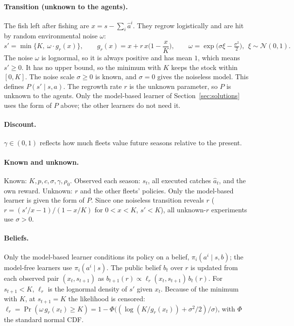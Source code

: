 \documentclass{article}
\begin{document}
\paragraph{Transition (unknown to the agents).} The fish left after fishing are $x=s-\sum_i \hat a^i$. They regrow logistically and are hit by random environmental noise $\omega$:
\begin{equation}
s'=\min\Big\{K,\ \omega\cdot g_r(x)\Big\},\qquad g_r(x)=x+r\,x\Big(1-\frac{x}{K}\Big),\qquad \omega=\exp\big(\sigma\xi-\tfrac{\sigma^2}{2}\big),\ \ \xi\sim\mathcal N(0,1).
\end{equation}
The noise $\omega$ is lognormal, so it is always positive and has mean $1$, which means $s'\ge0$. It has no upper bound, so the minimum with $K$ keeps the stock within $[0,K]$. The noise scale $\sigma\ge0$ is known, and $\sigma=0$ gives the noiseless model.
This defines $P(s'\mid s,a)$. The regrowth rate $r$ is the unknown parameter, so $P$ is unknown to the agents. Only the model-based learner of Section~\ref{sec:solutions} uses the form of $P$ above; the other learners do not need it.

\paragraph{Discount.} $\gamma\in(0,1)$ reflects how much fleets value future seasons relative to the present.

\paragraph{Known and unknown.} Known: $K,p,c,\sigma,\gamma,\rho_0$. Observed each season: $s_t$, all executed catches $\hat a_t$, and the own reward. Unknown: $r$ and the other fleets' policies. Only the model-based learner is given the form of $P$. Since one noiseless transition reveals $r$ ($r=(s'/x-1)/(1-x/K)$ for $0<x<K$, $s'<K$), all unknown-$r$ experiments use $\sigma>0$.

\paragraph{Beliefs.} Only the model-based learner conditions its policy on a belief, $\pi_i(a^i\mid s,b)$; the model-free learners use $\pi_i(a^i\mid s)$. The public belief $b_t$ over $r$ is updated from each observed pair $(x_t,s_{t+1})$ as $b_{t+1}(r)\propto\ell_r(x_t,s_{t+1})\,b_t(r)$. For $s_{t+1}<K$, $\ell_r$ is the lognormal density of $s'$ given $x_t$. Because of the minimum with $K$, at $s_{t+1}=K$ the likelihood is censored: $\ell_r=\Pr(\omega\,g_r(x_t)\ge K)=1-\Phi\big((\log(K/g_r(x_t))+\sigma^2/2)/\sigma\big)$, with $\Phi$ the standard normal CDF.
\end{document}
